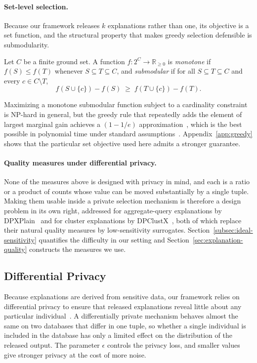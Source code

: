 \paragraph{Set-level selection.}
Because our framework releases $k$ explanations rather than one, its objective is a
set function, and the structural property that makes greedy selection defensible is
submodularity.

\begin{definition}
\label{def:submodular}
Let $C$ be a finite ground set. A function $f:2^{C}\rightarrow\mathbb{R}_{\ge 0}$ is
\emph{monotone} if $f(S)\le f(T)$ whenever $S\subseteq T\subseteq C$, and
\emph{submodular} if for all $S\subseteq T\subseteq C$ and every $c\in C\setminus T$,
\[
f(S\cup\{c\})-f(S) \;\ge\; f(T\cup\{c\})-f(T).
\]
\end{definition}

Maximizing a monotone submodular function subject to a cardinality constraint is
NP-hard in general, but the greedy rule that repeatedly adds the element of largest
marginal gain achieves a $(1-1/e)$ approximation~\cite{NemhauserWF78}, which is the
best possible in polynomial time under standard
assumptions~\cite{Feige98}.
Appendix~\ref{app:greedy} shows that the particular set objective
used here admits a stronger guarantee.

\paragraph{Quality measures under differential privacy.}
None of the measures above is designed with privacy in mind, and each is a ratio or
a product of counts whose value can be moved substantially by a single tuple.
Making them usable inside a private selection mechanism is therefore a design
problem in its own right, addressed for aggregate-query explanations by
DPXPlain~\cite{TaoGMR22} and for cluster explanations by
DPClustX~\cite{DPClustX}, both of which replace their natural quality measures by
low-sensitivity surrogates.
Section~\ref{subsec:ideal-sensitivity} quantifies the difficulty in our setting and
Section~\ref{sec:explanation-quality} constructs the measures we use.

\subsection{Differential Privacy}
\label{subsec:prelim-dp}
Because explanations are derived from sensitive data, our framework relies on
differential privacy to ensure that released explanations reveal little about any
particular individual~\cite{TheAlgFoundDP2014}. A differentially private mechanism
behaves almost the same on two databases that differ in one tuple, so whether a
single individual is included in the database has only a limited effect on the
distribution of the released output. The parameter $\epsilon$ controls the privacy
loss, and smaller values give stronger privacy at the cost of more noise.


